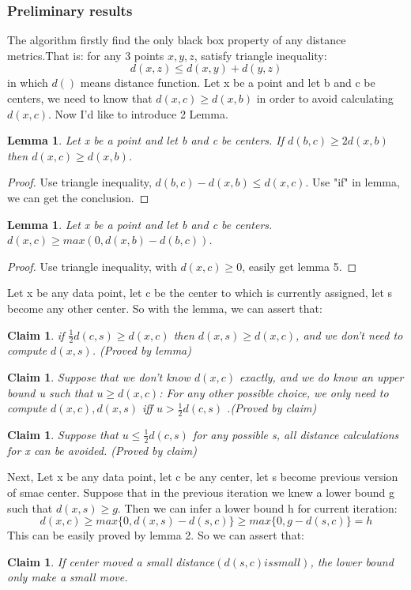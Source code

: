 \documentclass[11pt]{article}
\newtheorem{lemma}[theorem]{Lemma}
\newtheorem{claim}[theorem]{Claim}
\begin{document}
\subsubsection{Preliminary results}
The algorithm firstly find the only black box property of any distance metrics.That is: for any 3 points $x, y, z$, satisfy  triangle inequality:
$$d(x,z) \le d(x, y) + d(y, z)$$ in which $d()$ means distance function. Let x be a point and let b and c be centers, we need to know that $d(x, c) \ge d(x, b)$ in order to avoid calculating $d(x, c)$. Now I'd like to introduce 2 Lemma.
\begin{lemma}
Let x be a point and let b and c be centers. If $d(b, c) \ge 2d(x,b)$ then $d(x,c) \ge d(x,b)$.
\end{lemma}
\begin{proof}
Use  triangle inequality, $d(b,c) - d(x,b)\le d(x,c)$. Use "if" in lemma, we can get the conclusion.
\end{proof}
\begin{lemma}
Let x be a point and let b and c be centers.$d(x,c) \ge max(0, d(x,b)-d(b,c))$.
\end{lemma}
\begin{proof}
Use triangle inequality, with $d(x,c) \ge 0$, easily get lemma 5.
\end{proof}

Let x be any data point, let c be the center to which is currently assigned, let s become any other center. So with the lemma, we can assert that:
\begin{claim}
if $\frac{1}{2}d(c, s) \ge d(x,c)$ then $d(x, s) \ge d(x, c)$, and we don't need to compute $d(x,s)$. (Proved by lemma)
\end{claim}
\begin{claim}
Suppose that we don't know $d(x,c)$ exactly, and we do know an upper bound u such that $u \ge d(x,c)$: For any other possible choice, we only need to compute $d(x, c), d(x, s)$ iff $u > \frac{1}{2}d(c, s)$ .(Proved by claim)
\end{claim}
\begin{claim}
Suppose that $u \le \frac{1}{2}d(c, s)$ for any possible s, all distance calculations for x can be avoided. (Proved by claim)
\end{claim}

Next, Let x be any data point, let c be any center, let s become previous version of smae center. Suppose that in the previous iteration we knew a lower bound g such that $d(x, s) \ge g$. Then we can infer a lower bound h for current iteration:
$$
d(x, c) \ge max\{0, d(x,s)-d(s,c)\} \ge max\{0, g-d(s,c)\} = h
$$
This can be easily proved by lemma 2. So we can assert that:
\begin{claim}
If center moved a small distance$(d(s,c) is small)$, the lower bound only make a small move.
\end{claim}
\end{document}
